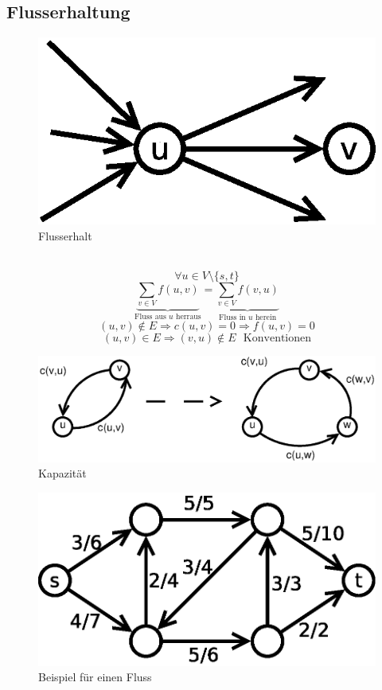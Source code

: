 \subsection{Flusserhaltung}
\begin{figure}
	\centering
	\includegraphics[width=\linewidth]{24/Grafik/Diagramm2}
	\caption{Flusserhalt}
	\label{fig:2}
	\end{figure}
	$ $
\[ \forall u\in V\setminus\{ s,t \} \]
\[  \underset{\text{Fluss aus $u$ herraus}}{\underbrace{\sum_{v\in V} f(u,v)}} = \underset{\text{Fluss in $u$ herein}}{\underbrace{\sum_{v\in V} f(v,u)}}  \]
\[ (u,v) \notin E \Rightarrow c(u,v) = 0 \Rightarrow f(u,v) = 0 \]
\[ (u,v) \in E \Rightarrow (v,u) \notin E~~~\text{Konventionen} \]
\begin{figure}[H]
\centering
\includegraphics[width=0.7\linewidth]{24/Grafik/Diagramm3}
\caption{Kapazität}
\label{fig:Diagramm3}
\end{figure}
\begin{figure}[H]
	\centering
	\includegraphics[width=0.7\linewidth]{24/Grafik/Diagramm4}
	\caption{Beispiel für einen Fluss}
	\label{fig:Diagramm4}
\end{figure}


